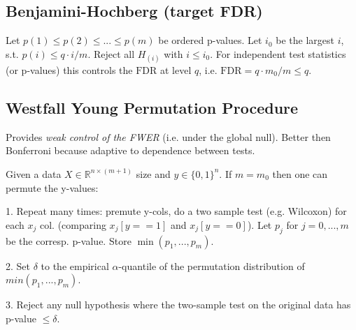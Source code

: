 \subsection*{Benjamini-Hochberg (target FDR)}
Let $p(1)\leq p(2) \leq ... \leq p(m)$ be ordered p-values. Let $i_0$ be the largest $i$, s.t. $p(i)\leq q\cdot i / m$. 
Reject all $H_{(i)}$ with $i\leq i_0$. For independent test statistics (or p-values) this controls the $\text{FDR}$ at level $q$, i.e. $\text{FDR}=q\cdot m_0 / m \leq q$. 

\subsection*{Westfall Young Permutation Procedure}
Provides \textit{weak control of the FWER} (i.e. under the global null). Better then Bonferroni because adaptive to dependence between tests.

Given a data $X \in \mathbb{R}^{n\times (m+1)}$ size and $y\in \{0,1\}^n$. 
If $m=m_0$ then one can permute the y-values:

1. Repeat many times: premute y-cols, do a two sample test (e.g. Wilcoxon) for each $x_j$ col. (comparing $x_j[y==1]$ and $x_j[y==0]$). Let $p_j$ for $j=0,...,m$ be the corresp. p-value. Store $\min(p_1,...,p_m)$.

2. Set $\delta$ to the empirical $\alpha$-quantile of the permutation distribution of $min(p_1,...,p_m)$. 

3. Reject any null hypothesis where the two-sample test on the original data has p-value $\leq \delta$.


